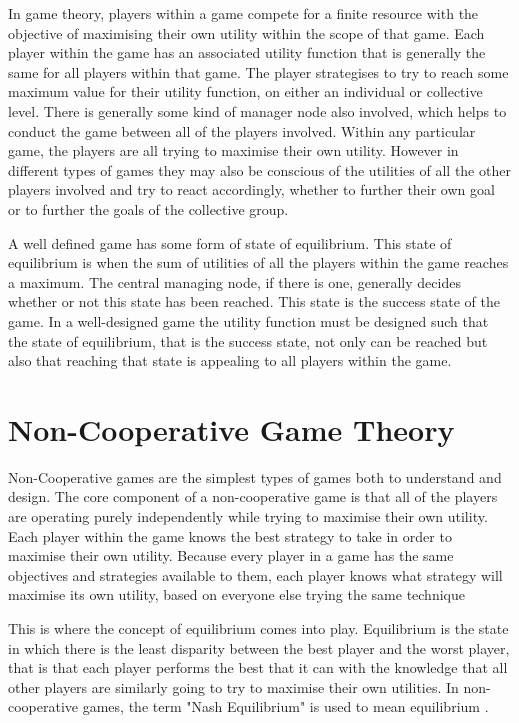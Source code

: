 \documentclass[a4paper, notitlepage]{report}
\begin{document}
In game theory, players within a game compete for a finite resource with the
objective of maximising their own utility within the scope of that game. Each
player within the game has an associated utility function that is generally the
same for all players within that game. The player strategises to try to reach
some maximum value for their utility function, on either an
individual or collective level. There is generally some kind of manager node
also involved, which helps to conduct the game between all of the players
involved. Within any particular game, the players are all trying to maximise
their own utility. However in different types of games they may also be
conscious of the utilities of all the other players involved and try to react
accordingly, whether to further their own goal or to further the goals of the
collective group.

A well defined game has some form of state of equilibrium. This state of
equilibrium is when the sum of utilities of all the players within the game
reaches a maximum. The central managing node, if there is one, generally decides
whether or not this state has been reached. This state is the success state of
the game. In a well-designed game the utility function must be designed such
that the state of equilibrium, that is the success state, not only can be
reached but also that reaching that state is appealing to all players within the
game.
\section{Non-Cooperative Game Theory}
\label{sec:org4f1a676}
Non-Cooperative games are the simplest types of games both to understand and
design. The core component of a non-cooperative game is that all of the players
are operating purely independently while trying to maximise their own utility.
Each player within the game knows the best strategy to take in order to maximise
their own utility. Because every player in a game has the same objectives and
strategies available to them, each player knows what strategy will maximise its
own utility, based on everyone else trying the same technique

This is where the concept of equilibrium comes into play. Equilibrium is the
state in which there is the least disparity between the best player and the
worst player, that is that each player performs the best that it can with the
knowledge that all other players are similarly going to try to maximise their
own utilities. In non-cooperative games, the term "Nash Equilibrium" is used to
mean equilibrium \cite{cournot1960researches}.
\end{document}
